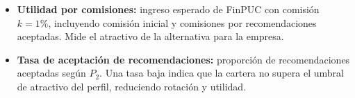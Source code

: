 \begin{itemize}
    \item \textbf{Utilidad por comisiones:} ingreso esperado de FinPUC con
    comisi\'on $k = 1\%$, incluyendo comisi\'on inicial y comisiones por
    recomendaciones aceptadas. Mide el atractivo de la alternativa para la
    empresa.

    \item \textbf{Tasa de aceptaci\'on de recomendaciones:} proporci\'on de
    recomendaciones aceptadas seg\'un $P_2$. Una tasa baja indica que la cartera
    no supera el umbral de atractivo del perfil, reduciendo rotaci\'on y utilidad.
\end{itemize}
